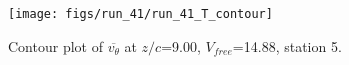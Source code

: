 \begin{figure}[H]
\centering
\texttt{[image: figs/run\_41/run\_41\_T\_contour]}
\caption{Contour plot of $\overline{v_{\theta}}$ at $z/c$=9.00, $V_{free}$=14.88, station 5.}
\label{fig:run_41_T_contour}
\end{figure}


